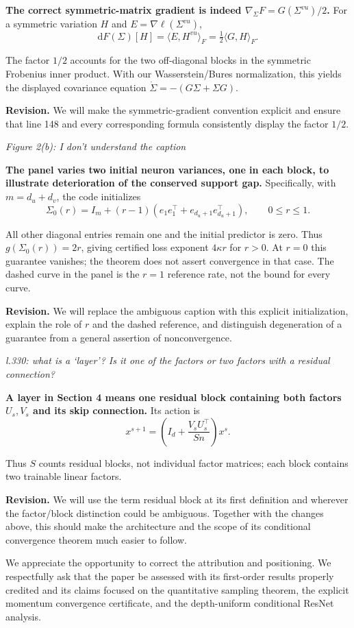 \documentclass[11pt,a4paper]{article}
\renewenvironment{quote}
  {\par\addvspace{0.8em}\Needspace{8\baselineskip}%
    \list{}{\leftmargin=1.2em\rightmargin=0pt\topsep=0.25em
    \parsep=0.3em}\item\relax\normalsize\itshape\color{quotegray}}
  {\endlist\nopagebreak[4]}
\begin{document}
\textbf{The correct symmetric-matrix gradient is indeed \(\nabla_\Sigma F=G(\Sigma^{vu})/2\).} For a symmetric variation \(H\) and \(E=\nabla\ell(\Sigma^{vu})\),
\[
\mathrm dF(\Sigma)[H]=\langle E,H^{vu}\rangle_F
=\tfrac12\langle G,H\rangle_F.
\]

The factor \(1/2\) accounts for the two off-diagonal blocks in the symmetric Frobenius inner product. With our Wasserstein/Bures normalization, this yields the displayed covariance equation \(\dot\Sigma=-(G\Sigma+\Sigma G)\).

\textbf{Revision.} We will make the symmetric-gradient convention explicit and ensure that line 148 and every corresponding formula consistently display the factor \(1/2\).

\begin{quote}
Figure 2(b): I don't understand the caption
\end{quote}

\textbf{The panel varies two initial neuron variances, one in each block, to illustrate deterioration of the conserved support gap.} Specifically, with \(m=d_u+d_v\), the code initializes
\[
\Sigma_0(r)=I_m+(r-1)(e_1e_1^\top+e_{d_u+1}e_{d_u+1}^\top),
\qquad 0\le r\le1.
\]

All other diagonal entries remain one and the initial predictor is zero. Thus \(g(\Sigma_0(r))=2r\), giving certified loss exponent \(4\kappa r\) for \(r>0\). At \(r=0\) this guarantee vanishes; the theorem does not assert convergence in that case. The dashed curve in the panel is the \(r=1\) reference rate, not the bound for every curve.

\textbf{Revision.} We will replace the ambiguous caption with this explicit initialization, explain the role of \(r\) and the dashed reference, and distinguish degeneration of a guarantee from a general assertion of nonconvergence.

\begin{quote}
l.330: what is a `layer'? Is it one of the factors or two factors with a residual connection?
\end{quote}

\textbf{A layer in Section 4 means one residual block containing both factors \(U_s,V_s\) and its skip connection.} Its action is
\[
x^{s+1}=\left(I_d+\frac{V_sU_s^\top}{Sn}\right)x^s.
\]

Thus \(S\) counts residual blocks, not individual factor matrices; each block contains two trainable linear factors.

\textbf{Revision.} We will use the term residual block at its first definition and wherever the factor/block distinction could be ambiguous. Together with the changes above, this should make the architecture and the scope of its conditional convergence theorem much easier to follow.

We appreciate the opportunity to correct the attribution and positioning. We respectfully ask that the paper be assessed with its first-order results properly credited and its claims focused on the quantitative sampling theorem, the explicit momentum convergence certificate, and the depth-uniform conditional ResNet analysis.
\end{document}
